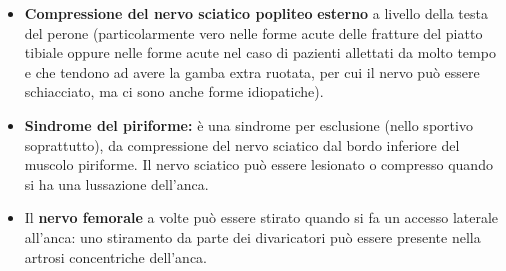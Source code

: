 \documentclass[]{article}
\begin{document}
\begin{itemize}
\item
  \textbf{Compressione del nervo sciatico popliteo} \textbf{esterno} a
  livello della testa del perone (particolarmente vero nelle forme acute
  delle fratture del piatto tibiale oppure nelle forme acute nel caso di
  pazienti allettati da molto tempo e che tendono ad avere la gamba
  extra ruotata, per cui il nervo può essere schiacciato, ma ci sono
  anche forme idiopatiche).
\item
  \textbf{Sindrome del piriforme:} è una sindrome per esclusione (nello
  sportivo soprattutto), da compressione del nervo sciatico dal bordo
  inferiore del muscolo piriforme. Il nervo sciatico può essere
  lesionato o compresso quando si ha una lussazione dell'anca.
\item
  Il \textbf{nervo femorale} a volte può essere stirato quando si fa un
  accesso laterale all'anca: uno stiramento da parte dei divaricatori
  può essere presente nella artrosi concentriche dell'anca.
\end{itemize}
\end{document}
